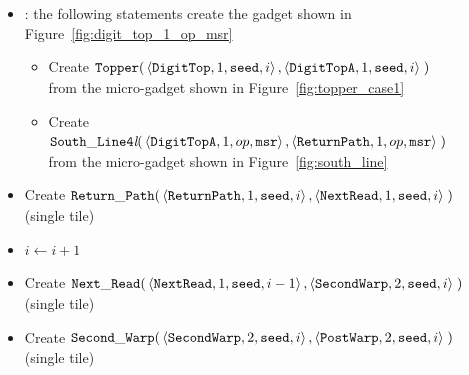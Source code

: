 \begin{itemize}
    \item {\dtop}: the following statements create the gadget shown in Figure~\ref{fig:digit_top_1_op_msr}
    \begin{itemize}
        \item Create
        $\begin{aligned}[t]
            {\tt Topper}(&\left\langle {\tt DigitTop},  1, {\tt seed}, i \right\rangle,
                          \left\langle {\tt DigitTopA}, 1, {\tt seed}, i \right\rangle \;)
        \end{aligned}$\\from the micro-gadget shown in Figure~\ref{fig:topper_case1}
        \item Create
        $\begin{aligned}[t]
            {\tt South\_Line4\textit{l}}(&\left\langle {\tt DigitTopA},  1, op, {\tt msr}\right\rangle,
                                          \left\langle {\tt ReturnPath}, 1, op, {\tt msr}\right\rangle \;)
        \end{aligned}$\\from the micro-gadget shown in Figure~\ref{fig:south_line}
    \end{itemize}

    \item Create
    $\begin{aligned}[t]
            {\tt Return\_Path}(&\left\langle {\tt ReturnPath}, 1, {\tt seed}, i \right\rangle,
                         \left\langle {\tt NextRead},   1, {\tt seed}, i \right\rangle \;)
    \end{aligned}$\\ (single tile)

    \item $i \gets i + 1$

    \item Create
    $\begin{aligned}[t]
            {\tt Next\_Read}(&\left\langle {\tt NextRead},   1, {\tt seed}, i-1 \right\rangle,
                       \left\langle {\tt SecondWarp}, 2, {\tt seed}, i   \right\rangle \;)
    \end{aligned}$\\ (single tile)


    \item Create
    $\begin{aligned}[t]
        {\tt Second\_Warp}(&\left\langle {\tt SecondWarp}, 2, {\tt seed}, i \right\rangle,
                     \left\langle {\tt PostWarp},   2, {\tt seed}, i \right\rangle \;)
    \end{aligned}$ \\ (single tile)


\end{itemize}

